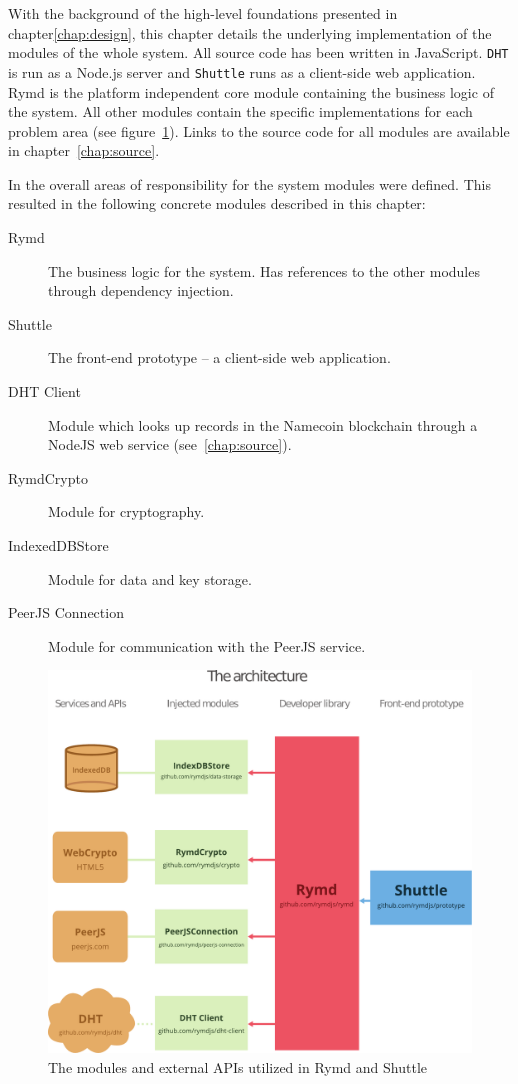 With the background of the high-level foundations presented in chapter\ref{chap:design}, this chapter details the underlying implementation of the modules of the whole system. All source code has been written in JavaScript. \texttt{DHT} is run as a Node.js server and \texttt{Shuttle} runs as a client-side web application. Rymd is the platform independent core module containing the business logic of the system. All other modules contain the specific implementations for each problem area (see figure~\ref{fig:architecture}). Links to the source code for all modules are available in chapter~\ref{chap:source}.

In  the overall areas of responsibility for the system modules were defined. This resulted in the following concrete modules described in this chapter:

\begin{description}
  \item[Rymd] The business logic for the system. Has references to the other modules through dependency injection.
  \item[Shuttle] The front-end prototype – a client-side web application.
  \item[DHT Client] Module which looks up records in the Namecoin blockchain through a NodeJS web service (see~\ref{chap:source}).
  \item[RymdCrypto] Module for cryptography.
  \item[IndexedDBStore] Module for data and key storage.
  \item[PeerJS Connection] Module for communication with the PeerJS service.
\end{description}

\begin{figure}[ht]
\centering
\includegraphics[width=\textwidth,height=0.4\paperheight,keepaspectratio
]{figures/architecture}
\caption{The modules and external APIs utilized in Rymd and Shuttle}
\label{fig:architecture}
\end{figure}

